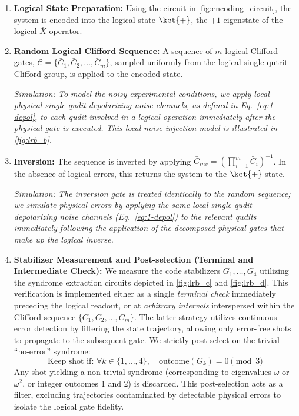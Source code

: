 \begin{enumerate}
    \item \textbf{Logical State Preparation:} Using the circuit in \autoref{fig:encoding_circuit}, the system is encoded into the logical state $\ket{\bar{+}}$, the $+1$ eigenstate of the logical $\bar{X}$ operator.
    
    \item \textbf{Random Logical Clifford Sequence:} A sequence of $m$ logical Clifford gates, $\mathcal{C} = \{\bar C_1, \bar C_2, \dots, \bar C_m\}$, sampled uniformly from the logical single-qutrit Clifford group, is applied to the encoded state.
    
    \textit{Simulation: To model the noisy experimental conditions, we apply local physical single-qudit depolarizing noise channels, as defined in Eq.~\eqref{eq:1-depol}, to each qudit involved in a logical operation immediately after the physical gate is executed. This local noise injection model is illustrated in \autoref{fig:lrb_b}.}
    
    \item \textbf{Inversion:} The sequence is inverted by applying $\bar C_{inv} = (\prod_{i=1}^m \bar C_i)^{-1}$. In the absence of logical errors, this returns the system to the $\ket{\bar{+}}$ state.
    
    \textit{Simulation: The inversion gate is treated identically to the random sequence; we simulate physical errors by applying the same local single-qudit depolarizing noise channels (Eq.~\eqref{eq:1-depol}) to the relevant qudits immediately following the application of the decomposed physical gates that make up the logical inverse.}
    
    \item \textbf{Stabilizer Measurement and Post-selection (Terminal and Intermediate Check):} 
    We measure the code stabilizers $G_1, \dots, G_4$ utilizing the syndrome extraction circuits depicted in \autoref{fig:lrb_c} and \autoref{fig:lrb_d}. This verification is implemented either as a single \emph{terminal check} immediately preceding the logical readout, or at \emph{arbitrary intervals} interspersed within the Clifford sequence $\{\bar C_1, \bar C_2, \dots, \bar C_m\}$. The latter strategy utilizes continuous error detection by filtering the state trajectory, allowing only error-free shots to propagate to the subsequent gate. We strictly post-select on the trivial ``no-error'' syndrome:
    \begin{equation}
        \text{Keep shot if: } \forall k \in \{1, \dots, 4\}, \quad \text{outcome}(G_k) = 0 \pmod 3
    \end{equation}
    Any shot yielding a non-trivial syndrome (corresponding to eigenvalues $\omega$ or $\omega^2$, or integer outcomes 1 and 2) is discarded. This post-selection acts as a filter, excluding trajectories contaminated by detectable physical errors to isolate the logical gate fidelity.


\end{enumerate}
